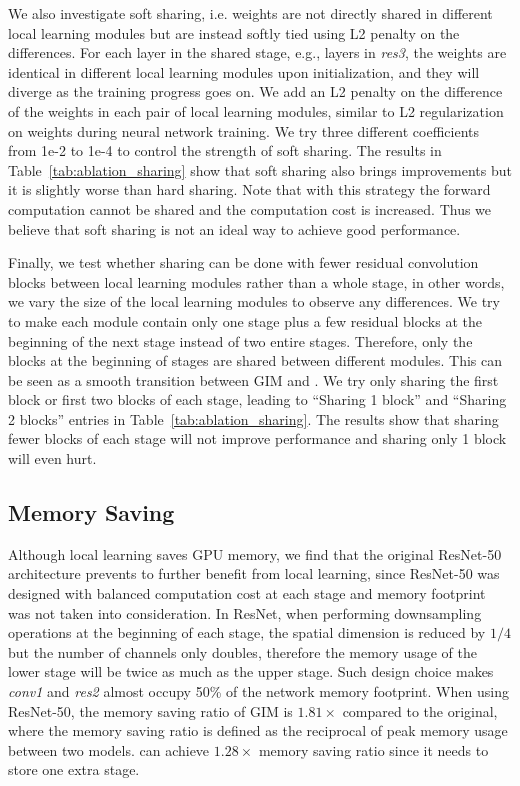 We also investigate soft sharing, i.e. weights are not directly shared in different local learning
modules but are instead softly tied using L2 penalty on the differences. For each layer in the
shared stage, e.g., layers in {\em res3}, the weights are identical in different local learning
modules upon initialization, and they will diverge as the training progress goes on. We add an L2
penalty on the difference of the weights in each pair of local learning modules, similar to L2
regularization on weights during neural network training. We try three different coefficients from
1e-2 to 1e-4 to control the strength of soft sharing. The results in
Table~\ref{tab:ablation_sharing} show that soft sharing also brings improvements but it is slightly
worse than hard sharing.  Note that with this strategy the forward computation cannot be shared and
the computation cost is increased. Thus we believe that soft sharing is not an ideal way to achieve
good performance.

Finally, we test whether sharing can be done with fewer residual convolution blocks between local
learning modules rather than a whole stage, in other words, we vary the size of the local learning
modules to observe any differences. We try to make each module contain only one stage plus a few
residual blocks at the beginning of the next stage instead of two entire stages. Therefore, only the
blocks at the beginning of stages are shared between different modules. This can be seen as a smooth
transition between GIM and {\ours}. We try only sharing the first block or first two blocks of each
stage, leading to ``Sharing 1 block'' and ``Sharing 2 blocks'' entries in
Table~\ref{tab:ablation_sharing}. The results show that sharing fewer blocks of each stage will not
improve performance and sharing only 1 block will even hurt.

\subsection{Memory Saving}

Although local learning saves GPU memory, we find that the original ResNet-50 architecture prevents
{\ours} to further benefit from local learning, since ResNet-50 was designed with balanced
computation cost at each stage and memory footprint was not taken into consideration. In ResNet,
when performing downsampling operations at the beginning of each stage, the spatial dimension is
reduced by $1/4$ but the number of channels only doubles, therefore the memory usage of the lower
stage will be twice as much as the upper stage. Such design choice makes {\em conv1} and {\em res2}
almost occupy 50\% of the network memory footprint. When using ResNet-50, the memory saving ratio
of GIM is $1.81\times$ compared to the original, where the memory saving ratio is defined as the
reciprocal of peak memory usage between two models. {\ours} can achieve $1.28\times$ memory saving
ratio since it needs to store one extra stage.

